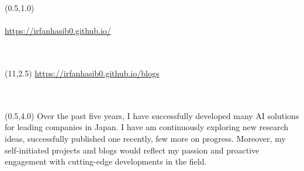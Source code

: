 \documentclass[article]{twentysecondcv_v2} %
\begin{document}
\begin{textblock}{20}(0.5,1.0)
\Large{\color{black}{Irfan Mohammad Al Hasib}\vspace{3pt}}\\
\medium{\color{gray}{Artificial Intelligence | Computer Vision Researcher}\vspace{5pt}}\\
\small{\color{mainblue}\faGlobeAsia\hspace{3pt}}{\href{https://irfanhasib0.github.io/}{\color{blue}https://irfanhasib0.github.io/}}\\
\small{\color{mainblue}\faAt\hspace{3pt}}{\color{blue}{irfanhasib.me@gmail.com}} \\
\small{\color{mainblue}\faPhone}{\color{black}{ +81 070 3832 6371}} \\
\end{textblock}

\begin{textblock}{15}(11,2.5)
\small{\color{mainblue}\faBlog}{ \href{https://irfanhasib0.github.io/blogs}{\color{blue}https://irfanhasib0.github.io/blogs}}\\
\\
\small{\color{mainblue}\faEnvelope}{\color{black}{ 6-1-5-206 Mayebaranishi, Funabashi, Chiba, Japan}} \\
\end{textblock}

\begin{textblock}{20}(0.5,4.0)
Over the past five years, I have successfully developed many AI solutions for leading companies in Japan. I have am continuously exploring new research ideas, successfully published one recently, few more on progress. Moreover, my self-initiated projects and blogs would reflect my passion and proactive engagement with cutting-edge developments in the field.
\end{textblock}
\end{document}
